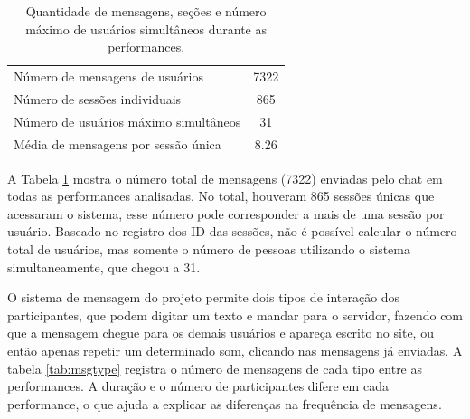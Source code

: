 \begin{table}[ht!]
\caption{Quantidade de mensagens, seções e número máximo de usuários simultâneos durante as performances.}{%
\begin{tabular}{@{}lc@{}}\hline
 Número de mensagens de usuários & 7322\\
 Número de sessões individuais & 865\\
 Número de usuários máximo simultâneos & 31\\
 Média de mensagens por sessão única & 8.26\\
\end{tabular}}
\label{tab:overallmsg}
\end{table}

A Tabela \ref{tab:overallmsg} mostra o número total de mensagens (7322) enviadas pelo chat em todas as performances analisadas. No total, houveram 865 sessões únicas que acessaram o sistema, esse número pode corresponder a mais de uma sessão por usuário. Baseado no registro dos ID das sessões, não é possível calcular o número total de usuários, mas somente o número de pessoas utilizando o sistema simultaneamente, que chegou a 31.


O sistema de mensagem do projeto permite dois tipos de interação dos participantes, que podem digitar um texto e mandar para o servidor, fazendo com que a mensagem chegue para os demais usuários e apareça escrito no site, ou então apenas repetir um determinado som, clicando nas mensagens já enviadas. A tabela \ref{tab:msgtype} registra o número de mensagens de cada tipo entre as performances. A duração e o número de participantes difere em cada performance, o que ajuda a explicar as diferenças na frequência de mensagens.


